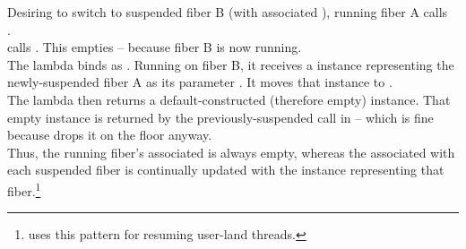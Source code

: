Desiring to switch to suspended fiber B (with associated
 ), running fiber A calls\\
.\\

 calls .
This empties  -- because fiber B is now running.\\

The lambda binds  as . Running on fiber B, it
receives a \fiber instance representing the newly-suspended fiber A as its
parameter . It moves that \fiber instance to .\\

The lambda then returns a default-constructed (therefore empty) \fiber
instance. That empty instance is returned by the previously-suspended
\resumewith call in  -- which is fine because
 drops it on the floor anyway.\\

Thus, the running fiber's associated  is always empty,
whereas the  associated with each suspended fiber is continually
updated with the \fiber instance representing that
fiber.\footnote{\bfiber\cite{bfiber} uses this pattern for resuming user-land
threads.}

